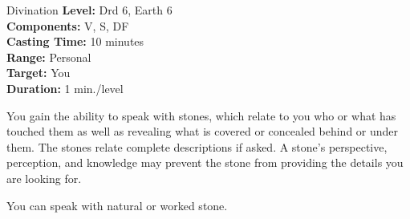 {Divination}
{
	\textbf{Level:}
	Drd 6, Earth 6\\
	\textbf{Components:}
	V, S, DF\\
	\textbf{Casting Time:}
	10 minutes\\
	\textbf{Range:}
	Personal\\
	\textbf{Target:}
	You\\
	\textbf{Duration:}
	1 min./level\\
}
{
	You gain the ability to speak with stones, which relate to you who or what has touched them as well as revealing what is covered or concealed behind or under them. The stones relate complete descriptions if asked. A stone's perspective, perception, and knowledge may prevent the stone from providing the details you are looking for.

	You can speak with natural or worked stone.

}
